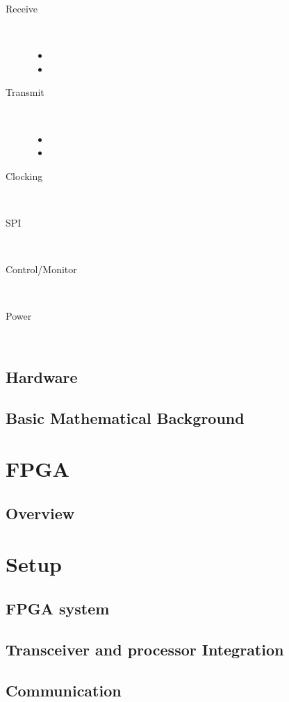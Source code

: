 \begin{description}
	\item[Receive] \hfill \\
	\begin{itemize}
		\item 
		\item 
	\end{itemize}
	\item[Transmit] \hfill \\
\begin{itemize}
		\item 
		\item 
	\end{itemize}

	\item[Clocking] \hfill \\

	\item[SPI] \hfill \\

	\item[Control/Monitor] \hfill \\

	\item[Power] \hfill \\

\end{description}

\subsection{Hardware}


\subsection{Basic Mathematical Background}

\section{FPGA}
\subsection{Overview}


\section{Setup}

\subsection{FPGA system}

\subsection{Transceiver and processor Integration}

\subsection{Communication}
